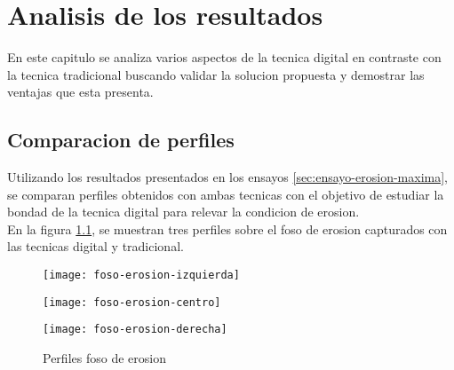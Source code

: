\chapter{Analisis de los resultados}

En este capitulo se analiza varios aspectos de la tecnica digital en contraste con la tecnica tradicional buscando validar la solucion propuesta y demostrar las ventajas que esta presenta.  

\section{Comparacion de perfiles}
Utilizando los resultados presentados en los ensayos \ref{sec:ensayo-erosion-maxima}, se comparan perfiles obtenidos con ambas tecnicas con el objetivo de estudiar la bondad de la tecnica digital para relevar la condicion de erosion. \\

En la figura \ref{fig:comparacion-perfiles}, se muestran tres perfiles sobre el foso de erosion capturados con las tecnicas digital y tradicional.\\

\begin{figure}[ht]
\centering
\begin{minipage}[h]{.45\textwidth}
\begin{center}
\texttt{[image: foso-erosion-izquierda]}
\end{center}
\end{minipage}
\hfill
\begin{minipage}[h]{.45\textwidth}
\begin{center}
\texttt{[image: foso-erosion-centro]}
\end{center}
\end{minipage}
\hfill
\begin{minipage}[h]{.45\textwidth}
\begin{center}
\texttt{[image: foso-erosion-derecha]}
\end{center}
\end{minipage}
\hfill
\caption[Perfiles foso de erosion]
{Perfiles foso de erosion}
\label{fig:comparacion-perfiles}
\end{figure}

